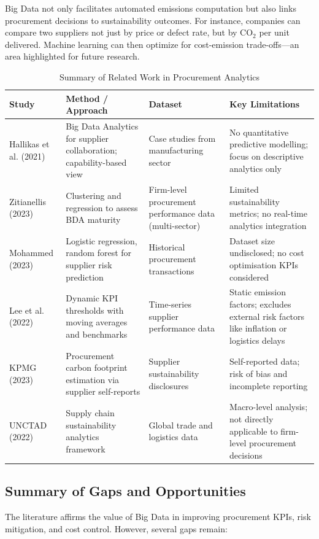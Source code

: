 \documentclass[10pt, twocolumn]{article}
\begin{document}
Big Data not only facilitates automated emissions computation but also links procurement decisions to sustainability outcomes. For instance, companies can compare two suppliers not just by price or defect rate, but by CO$_2$ per unit delivered. Machine learning can then optimize for cost-emission trade-offs—an area highlighted for future research.

\begin{table}[htbp]
\centering
\caption{Summary of Related Work in Procurement Analytics}
\label{tab:lit_summary}
\begin{tabular}{p{3cm} p{4cm} p{3cm} p{5cm}}
\hline
\textbf{Study} & \textbf{Method / Approach} & \textbf{Dataset} & \textbf{Key Limitations} \\
\hline
Hallikas et al. (2021) & Big Data Analytics for supplier collaboration; capability-based view & Case studies from manufacturing sector & No quantitative predictive modelling; focus on descriptive analytics only \\
Zitianellis (2023) & Clustering and regression to assess BDA maturity & Firm-level procurement performance data (multi-sector) & Limited sustainability metrics; no real-time analytics integration \\
Mohammed (2023) & Logistic regression, random forest for supplier risk prediction & Historical procurement transactions & Dataset size undisclosed; no cost optimisation KPIs considered \\
Lee et al. (2022) & Dynamic KPI thresholds with moving averages and benchmarks & Time-series supplier performance data & Static emission factors; excludes external risk factors like inflation or logistics delays \\
KPMG (2023) & Procurement carbon footprint estimation via supplier self-reports & Supplier sustainability disclosures & Self-reported data; risk of bias and incomplete reporting \\
UNCTAD (2022) & Supply chain sustainability analytics framework & Global trade and logistics data & Macro-level analysis; not directly applicable to firm-level procurement decisions \\
\hline
\end{tabular}
\end{table}

\subsection{Summary of Gaps and Opportunities}
The literature affirms the value of Big Data in improving procurement KPIs, risk mitigation, and cost control. However, several gaps remain:
\end{document}
